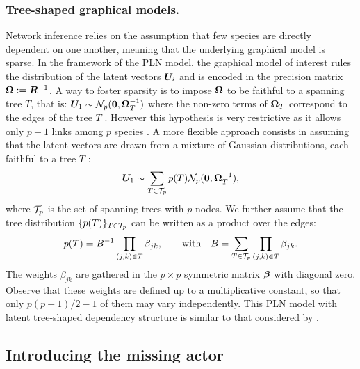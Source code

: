 \subsubsection*{Tree-shaped graphical models.} 
Network inference relies on the assumption that few species are directly dependent on one another, meaning that the underlying graphical model is sparse. In the framework of the PLN model, the graphical model of interest rules the distribution of the latent vectors ${\boldsymbol{U}}_i$ and is  encoded in the precision matrix ${\boldsymbol{\Omega}}:={\boldsymbol{R}}^{-1}$. A way to foster sparsity is to impose ${\boldsymbol{\Omega}}$ to be faithful to a spanning tree $T$, that is: ${\boldsymbol{U}}_1 \sim {\mathcal{N}}_p({\boldsymbol{0}}, {\boldsymbol{\Omega}}_T^{-1})$ where the non-zero terms of ${\boldsymbol{\Omega}}_T$ correspond to the edges of the tree $T$ . However this hypothesis is very restrictive  as it allows only $p-1$ links among $p$ species \citep{ChowLiu}. A more flexible approach consists in assuming that the latent vectors are drawn from a mixture of Gaussian distributions, each faithful to a tree $T$ \citep{MixtTrees,MeilaJaak,kirshner,SRS19}:
\begin{equation} \label{eq:mixt-Z}
{\boldsymbol{U}}_1 \sim \sum_{T \in {\mathcal{T}}_p} p(T) {\mathcal{N}}_p({\boldsymbol{0}}, {\boldsymbol{\Omega}}_T^{-1}),
\end{equation}
where ${\mathcal{T}}_p$ is the set of spanning trees with $p$ nodes.
We further assume that the tree distribution $\{p(T)\}_{T \in {\mathcal{T}}_p}$ can be written as a product over the edges:
\begin{equation} \label{eq:prob-T}
p(T) = B^{-1} \prod_{(j, k) \in T} \beta_{jk}, \qquad
\text{with} \quad B = \sum_{T \in {\mathcal{T}}_p} \prod_{(j, k) \in T} \beta_{jk}.
\end{equation}
The weights $\beta_{jk}$ are gathered in the $p \times p$ symmetric matrix ${\boldsymbol{\beta}}$ with diagonal zero. Observe that these weights are defined up to a multiplicative constant, so that only $p(p-1)/2 - 1$ of them may vary independently. This PLN model with latent tree-shaped dependency structure is similar to that considered by \cite{MRA20}.

\subsection{Introducing the missing actor} \label{sec:missActor}

